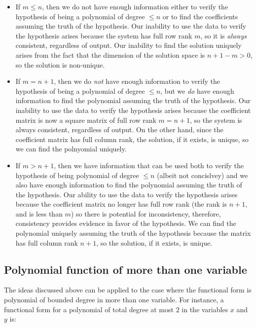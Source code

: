 \documentclass[10pt]{amsart}
\begin{document}
\begin{itemize}
\item If $m \le n$, then we do not have enough information either to
  verify the hypothesis of being a polynomial of degree $\le n$ or to
  find the coefficients assuming the truth of the hypothesis. Our
  inability to use the data to verify the hypothesis arises because
  the system has full row rank $m$, so it is {\em always} consistent,
  regardless of output. Our inability to find the solution uniquely
  arises from the fact that the dimension of the solution space is $n
  + 1 - m > 0$, so the solution is non-unique.
\item If $m = n + 1$, then we do {\em not} have enough information to
  verify the hypothesis of being a polynomial of degree $\le n$, but
  we {\em do} have enough information to find the polynomial assuming
  the truth of the hypothesis. Our inability to use the data to verify
  the hypothesis arises because the coefficient matrix is now a square
  matrix of full row rank $m = n + 1$, so the system is always
  consistent, regardless of output. On the other hand, since the
  coefficient matrix has full column rank, the solution, if it exists,
  is unique, so we can find the polnyomial uniquely.
\item If $m > n + 1$, then we have information that can be used both
  to verify the hypothesis of being polynomial of degree $\le n$
  (albeit not concislvey) and we also have enough information to find
  the polynomial assuming the truth of the hypothesis. Our ability to
  use the data to verify the hypothesis arises because the coefficient
  matrix no longer has full row rank (the rank is $n + 1$, and is less
  than $m$) so there is potential for inconsistency, therefore,
  consistency provides evidence in favor of the hypothesis. We can
  find the polynomial uniquely assuming the truth of the hypothesis
  because the matrix has full column rank $n + 1$, so the solution, if
  it exists, is unique.
\end{itemize}

\subsection{Polynomial function of more than one variable}

The ideas discussed above can be applied to the case where the
functional form is polynomial of bounded degree in more than one
variable. For instance, a functional form for a polynomial of total
degree at most $2$ in the variables $x$ and $y$ is:
\end{document}
